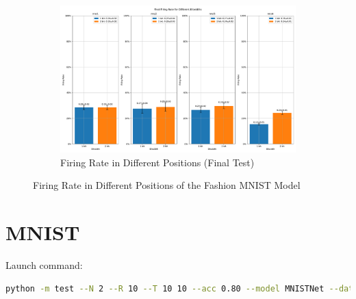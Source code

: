 \begin{figure}[H]
\begin{subfigure}[H]{\textwidth}
                \includegraphics[width=\textwidth]{../firerate/FashionMNIST/plots/fashionmnist_final_firerate.pdf}
                \caption{Firing Rate in Different Positions (Final Test)}
            \end{subfigure}
            \caption{Firing Rate in Different Positions of the Fashion MNIST Model}
        \end{figure}

    \section{MNIST}
    \label{appendix:firerate_mnist}
        Launch command: 
        \begin{lstlisting}[language=Bash, basicstyle=\small, breaklines=true]
python -m test --N 2 --R 10 --T 10 10 --acc 0.80 --model MNISTNet --data-path /scratch/zyi/codeSpace/data --dataset MNIST --batch-size 128 --opt adam --lr 2e-3 --lr-scheduler none --epochs 50 --lr-warmup-epochs 0 --output-dir /scratch/zyi/codeSpace/MultibitSpikes/firerate --mixup-alpha 0.0 --cutmix-alpha 0.0 --label-smoothing 0.0 --disable-amp
        \end{lstlisting}

